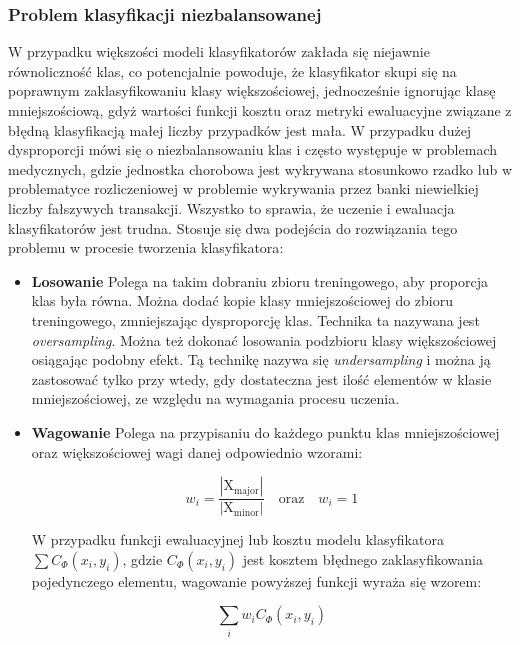 \subsubsection{Problem klasyfikacji niezbalansowanej}
W przypadku większości modeli klasyfikatorów zakłada się niejawnie równoliczność klas, co potencjalnie powoduje, że klasyfikator skupi się na poprawnym zaklasyfikowaniu klasy większościowej, jednocześnie ignorując klasę mniejszościową, gdyż wartości funkcji kosztu oraz metryki ewaluacyjne związane z błędną klasyfikacją małej liczby przypadków jest mała. W przypadku dużej dysproporcji mówi się o niezbalansowaniu klas i często występuje w problemach medycznych, gdzie jednostka chorobowa jest wykrywana stosunkowo rzadko lub w problematyce rozliczeniowej w problemie wykrywania przez banki niewielkiej liczby fałszywych transakcji. Wszystko to sprawia, że uczenie i ewaluacja klasyfikatorów jest trudna. Stosuje się dwa podejścia do rozwiązania tego problemu w procesie tworzenia klasyfikatora\cite{matematyk2022-fh}:
\begin{itemize}
    \item \textbf{Losowanie} Polega na takim dobraniu zbioru treningowego, aby proporcja klas była równa. Można dodać kopie klasy mniejszościowej do zbioru treningowego, zmniejszając dysproporcję klas. Technika ta nazywana jest \textit{oversampling}. Można też dokonać losowania podzbioru klasy większościowej osiągając podobny efekt. Tą technikę nazywa się \textit{undersampling} i można ją zastosować tylko przy wtedy, gdy dostateczna jest ilość elementów w klasie mniejszościowej, ze względu na wymagania procesu uczenia.  
    \item \textbf{Wagowanie} Polega na przypisaniu do każdego punktu klas mniejszościowej oraz większościowej  wagi danej odpowiednio wzorami:
    \par \[w_i=\mathrm{\frac{|X_{major}|}{|X_{minor}|}} \quad \mathrm{ oraz } \quad  w_i=1\]
    \par
    W przypadku funkcji ewaluacyjnej lub kosztu modelu klasyfikatora $\sum {C_{\Phi}(x_i,y_i)}$, gdzie $ C_{\Phi}(x_i,y_i)$ jest kosztem błędnego zaklasyfikowania pojedynczego elementu, wagowanie powyższej funkcji wyraża się wzorem:
    \par
    \[\sum_{i} w_iC_{\Phi}(x_i,y_i)\]

\end{itemize}

